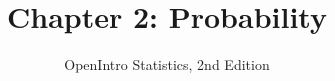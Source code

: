 \documentclass[slidestop,compress,mathserif]{beamer}
\title[Chp 2: Probability]{Chapter 2: Probability}
\author{OpenIntro Statistics, 2nd Edition}
\date{}
\institute{}
\begin{document}


\begin{frame}[plain]

\titlepage

\end{frame}








\end{document}
